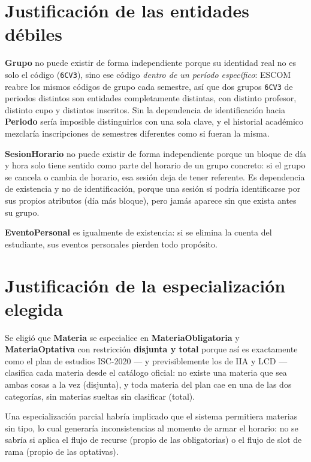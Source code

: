 \documentclass[11pt,letterpaper]{article}
\begin{document}
\section{Justificación de las entidades débiles}

\textbf{Grupo} no puede existir de forma independiente porque su identidad real no es solo el código (\texttt{6CV3}), sino ese código \textit{dentro de un período específico}: ESCOM reabre los mismos códigos de grupo cada semestre, así que dos grupos \texttt{6CV3} de periodos distintos son entidades completamente distintas, con distinto profesor, distinto cupo y distintos inscritos. Sin la dependencia de identificación hacia \textbf{Periodo} sería imposible distinguirlos con una sola clave, y el historial académico mezclaría inscripciones de semestres diferentes como si fueran la misma.

\textbf{SesionHorario} no puede existir de forma independiente porque un bloque de día y hora solo tiene sentido como parte del horario de un grupo concreto: si el grupo se cancela o cambia de horario, esa sesión deja de tener referente. Es dependencia de existencia y no de identificación, porque una sesión sí podría identificarse por sus propios atributos (día más bloque), pero jamás aparece sin que exista antes su grupo.

\textbf{EventoPersonal} es igualmente de existencia: si se elimina la cuenta del estudiante, sus eventos personales pierden todo propósito.

\section{Justificación de la especialización elegida}

Se eligió que \textbf{Materia} se especialice en \textbf{MateriaObligatoria} y \textbf{MateriaOptativa} con restricción \textbf{disjunta y total} porque así es exactamente como el plan de estudios ISC-2020 --- y previsiblemente los de IIA y LCD --- clasifica cada materia desde el catálogo oficial: no existe una materia que sea ambas cosas a la vez (disjunta), y toda materia del plan cae en una de las dos categorías, sin materias sueltas sin clasificar (total).

Una especialización parcial habría implicado que el sistema permitiera materias sin tipo, lo cual generaría inconsistencias al momento de armar el horario: no se sabría si aplica el flujo de recurse (propio de las obligatorias) o el flujo de slot de rama (propio de las optativas).
\end{document}
